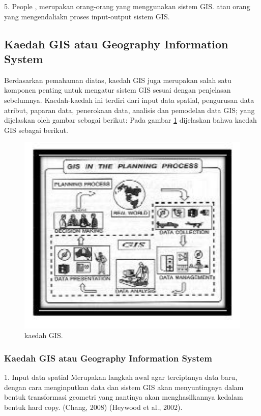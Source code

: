 5. People , merupakan orang-orang yang menggunakan sistem GIS. atau orang yang mengendaliakn proses input-output sistem GIS. 

\subsection{Kaedah GIS atau Geography Information System}
Berdasarkan pemahaman diatas, kaedah GIS juga merupakan salah satu komponen penting untuk mengatur sistem GIS sesuai dengan penjelasan sebelumnya. Kaedah-kaedah ini terdiri dari input
data spatial, pengurusan data atribut, paparan data, penerokaan data, analisis dan pemodelan data GIS;
yang dijelaskan oleh gambar sebagai berikut:
Pada gambar \ref{kaedahGIS} dijelaskan bahwa kaedah GIS sebagai berikut.
\begin{figure}[ht]
	\centerline{\includegraphics[width=1\textwidth]{figures/kaedahGIS.JPG}}
	\caption{kaedah GIS.}
	\label{kaedahGIS}
	\end{figure}

\subsubsection{Kaedah GIS atau Geography Information System}
1. Input data spatial
Merupakan langkah awal agar terciptanya data baru, dengan cara menginputkan data dan sistem GIS akan menyuntingnya dalam bentuk transformasi geometri yang nantinya akan menghasilkannya kedalam bentuk hard copy. (Chang, 2008) 
(Heywood et al., 2002).

